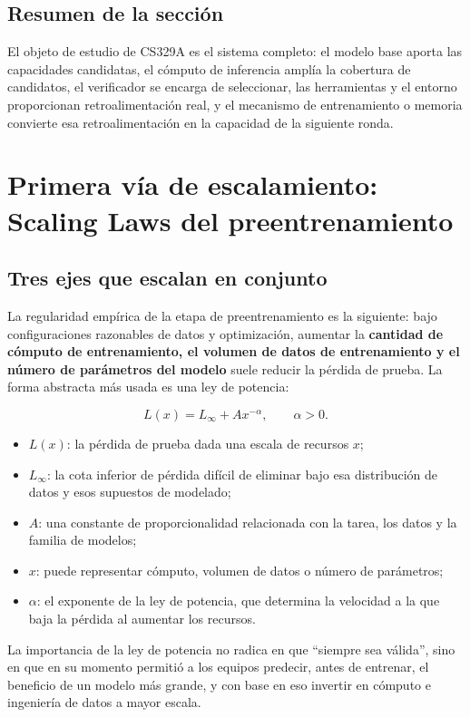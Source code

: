 \documentclass[a4paper]{article}
\begin{document}
\subsection{Resumen de la sección}

El objeto de estudio de CS329A es el sistema completo: el modelo base aporta las capacidades candidatas, el cómputo de inferencia amplía la cobertura de candidatos, el verificador se encarga de seleccionar, las herramientas y el entorno proporcionan retroalimentación real, y el mecanismo de entrenamiento o memoria convierte esa retroalimentación en la capacidad de la siguiente ronda.

\section{Primera vía de escalamiento: Scaling Laws del preentrenamiento}

\subsection{Tres ejes que escalan en conjunto}

La regularidad empírica de la etapa de preentrenamiento es la siguiente: bajo configuraciones razonables de datos y optimización, aumentar la \textbf{cantidad de cómputo de entrenamiento, el volumen de datos de entrenamiento y el número de parámetros del modelo} suele reducir la pérdida de prueba. La forma abstracta más usada es una ley de potencia:

$$
L(x)=L_{\infty}+A x^{-\alpha},\qquad \alpha>0.
$$

\begin{itemize}
    \item $L(x)$: la pérdida de prueba dada una escala de recursos $x$;
    \item $L_{\infty}$: la cota inferior de pérdida difícil de eliminar bajo esa distribución de datos y esos supuestos de modelado;
    \item $A$: una constante de proporcionalidad relacionada con la tarea, los datos y la familia de modelos;
    \item $x$: puede representar cómputo, volumen de datos o número de parámetros;
    \item $\alpha$: el exponente de la ley de potencia, que determina la velocidad a la que baja la pérdida al aumentar los recursos.
\end{itemize}

La importancia de la ley de potencia no radica en que “siempre sea válida”, sino en que en su momento permitió a los equipos predecir, antes de entrenar, el beneficio de un modelo más grande, y con base en eso invertir en cómputo e ingeniería de datos a mayor escala.
\end{document}
